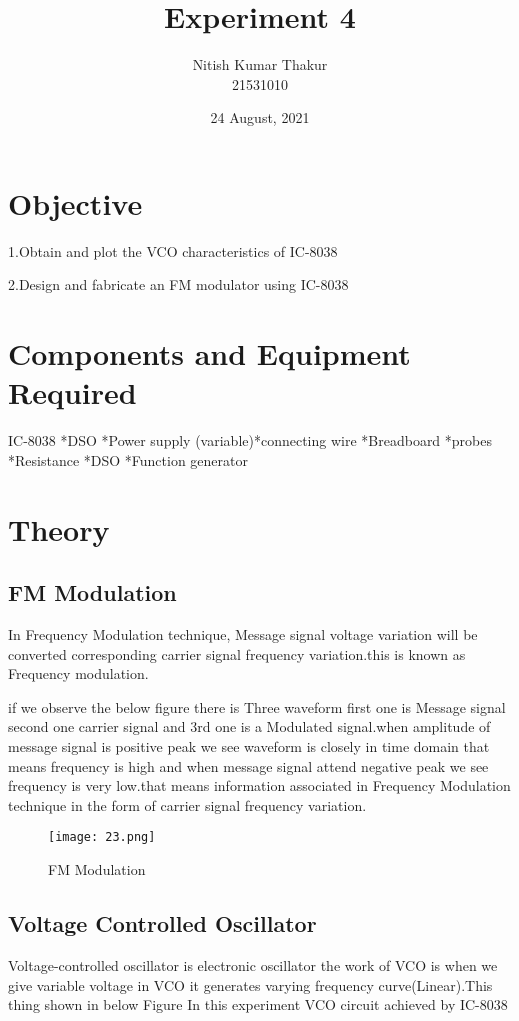 \documentclass{article}
\title{Experiment 4}
\author{Nitish Kumar Thakur \\ 21531010 }
\date{24 August, 2021}
\begin{document}
\maketitle

\section{Objective}
1.Obtain and plot the VCO characteristics of IC-8038 \par
2.Design and fabricate an FM modulator using IC-8038
 
 \section{Components and Equipment Required}                    
 IC-8038 *DSO *Power supply (variable)*connecting wire *Breadboard *probes *Resistance *DSO *Function generator
 
\section{Theory}

\subsection{FM Modulation}
In Frequency Modulation technique, Message signal voltage variation will be converted corresponding carrier signal frequency variation.this is known as Frequency modulation.\par
if we observe the below figure there is Three waveform first one is Message signal second one carrier signal and 3rd one is a Modulated signal.when amplitude of message signal is positive peak we see waveform is closely in time domain that means frequency is high and when message signal attend negative peak we see frequency is very low.that means information associated in Frequency Modulation technique in the form of carrier signal frequency variation.

\begin{figure*}[h]
	\centering
	\texttt{[image: 23.png]}
	\caption{FM Modulation}
	\label{FBD}
\end{figure*}


\subsection{Voltage Controlled Oscillator}
Voltage-controlled oscillator is electronic oscillator the work of VCO is when we give variable voltage in VCO it generates varying frequency curve(Linear).This thing shown in below Figure
In this experiment VCO circuit achieved by IC-8038
\end{document}
